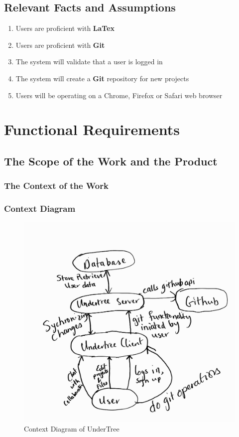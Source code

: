 \documentclass[12pt, titlepage]{article}
\begin{document}
	\subsection{Relevant Facts and Assumptions}
	
	\begin{enumerate}
		\item Users are proficient with \textbf{LaTex}
		\item Users are proficient with \textbf{Git}
		\item The system will validate that a user is logged in
		\item The system will create a \textbf{Git} repository for new projects
		\item Users will be operating on a Chrome, Firefox or Safari web browser
	\end{enumerate}
	
	\section{Functional Requirements}
	
	\subsection{The Scope of the Work and the Product}
	
	\subsubsection{The Context of the Work}
	
	\subsubsection{Context Diagram}
	
	\begin{figure}[H]
		\centering
		\includegraphics[scale=0.4]{context.jpg}
		\caption{Context Diagram of UnderTree}
	\end{figure}
	\newpage
\end{document}
